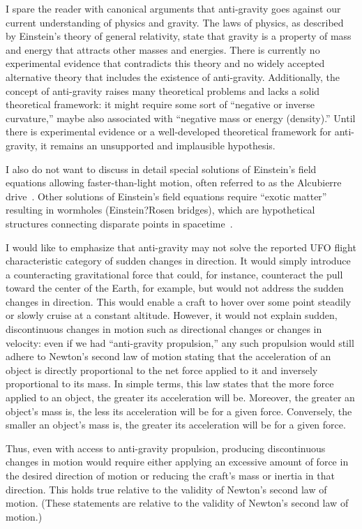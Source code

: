 I spare the reader with canonical arguments that
anti-gravity goes against our current understanding of physics and gravity.
The laws of physics, as described by Einstein's theory of general relativity,
state that gravity is a property of mass and energy that attracts other masses and energies.
There is currently no experimental evidence that contradicts this theory and no widely accepted alternative
theory that includes the existence of anti-gravity.
Additionally, the concept of anti-gravity raises many theoretical problems and lacks a solid theoretical framework:
it might require some sort of ``negative or inverse curvature,''
maybe also associated with ``negative mass or energy (density).''
Until there is experimental evidence or a well-developed theoretical framework for anti-gravity,
it remains an unsupported and implausible hypothesis.

I also do not want to discuss in detail special solutions of Einstein's field equations
allowing faster-than-light motion,
often referred to as the Alcubierre drive~\cite{0264-9381-11-5-001,Lentz2021,Fell_2021}.
Other solutions of Einstein's field equations require ``exotic matter'' resulting in
wormholes (Einstein?Rosen bridges), which are hypothetical structures connecting disparate points in spacetime~\cite{Misner-Wheeler-Thorne}.


I would like to emphasize that anti-gravity may not solve the reported UFO flight characteristic category of sudden changes in direction.
It would simply introduce a counteracting gravitational force that could, for instance, counteract the pull toward the center of the Earth,
for example, but would not address the sudden changes in direction.
This would enable a craft to hover over some point steadily or slowly cruise at a constant altitude.
However, it would not explain sudden, discontinuous changes in motion such as directional changes or changes in velocity:
even if we had ``anti-gravity propulsion,'' any such propulsion would still adhere to Newton's second law of motion
stating that the acceleration of an object is directly proportional to the net force applied to it and inversely proportional to its mass.
In simple terms, this law states that the more force applied to an object, the greater its acceleration will be.
Moreover, the greater an object's mass is, the less its acceleration will be for a given force.
Conversely, the smaller an object's mass is, the greater its acceleration will be for a given force.

Thus, even with access to anti-gravity propulsion, producing discontinuous changes in motion would require either applying an excessive amount of force in the
desired direction of motion or reducing the craft's mass or inertia in that direction.
This holds true relative to the validity of Newton's second law of motion.
(These statements are relative to the validity of Newton's second law of motion.)

